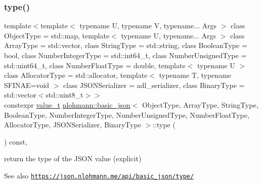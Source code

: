\subsubsection{\texorpdfstring{type()}{type()}}
{\footnotesize\ttfamily template$<$template$<$ typename U, typename V, typename... Args $>$ class Object\+Type = std\+::map, template$<$ typename U, typename... Args $>$ class Array\+Type = std\+::vector, class String\+Type  = std\+::string, class Boolean\+Type  = bool, class Number\+Integer\+Type  = std\+::int64\+\_\+t, class Number\+Unsigned\+Type  = std\+::uint64\+\_\+t, class Number\+Float\+Type  = double, template$<$ typename U $>$ class Allocator\+Type = std\+::allocator, template$<$ typename T, typename S\+F\+I\+N\+A\+E=void $>$ class J\+S\+O\+N\+Serializer = adl\+\_\+serializer, class Binary\+Type  = std\+::vector$<$std\+::uint8\+\_\+t$>$$>$ \\
constexpr \hyperlink{namespacenlohmann_1_1detail_a1ed8fc6239da25abcaf681d30ace4985}{value\+\_\+t} \hyperlink{classnlohmann_1_1basic__json}{nlohmann\+::basic\+\_\+json}$<$ Object\+Type, Array\+Type, String\+Type, Boolean\+Type, Number\+Integer\+Type, Number\+Unsigned\+Type, Number\+Float\+Type, Allocator\+Type, J\+S\+O\+N\+Serializer, Binary\+Type $>$\+::type (\begin{DoxyParamCaption}{ }\end{DoxyParamCaption}) const\hspace{0.3cm}{\ttfamily [inline]}, {\ttfamily [noexcept]}}



return the type of the J\+S\+ON value (explicit) 

\begin{DoxySeeAlso}{See also}
\href{https://json.nlohmann.me/api/basic_json/type/}{\tt https\+://json.\+nlohmann.\+me/api/basic\+\_\+json/type/} 
\end{DoxySeeAlso}
\mbox{\label{classnlohmann_1_1basic__json_a459dbfcd47bd632ca82ca8ff8db278c8}} 
